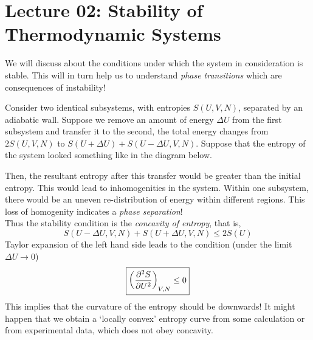 \section*{Lecture 02: Stability of Thermodynamic Systems}
We will discuss about the conditions under which the system in consideration is stable. This will in turn help us to understand \textit{phase transitions} which are consequences of instability! \\[0.2cm]

\begin{figure}[H]
    \centering
    
\end{figure}
\noindent
Consider two identical subsystems, with entropies $S(U,V,N)$, separated by an adiabatic wall. Suppose we remove an amount of energy $\Delta U$ from the first subsystem and transfer it to the second, the total energy changes from $2S(U,V,N)$ to $S(U+\Delta U)+S(U-\Delta U,V,N)$. Suppose that the entropy of the system looked something like in the diagram below. 
\begin{figure}[H]
    \centering
\end{figure}
\noindent
Then, the resultant entropy after this transfer would be greater than the initial entropy. This would lead to inhomogenities in the system. Within one subsystem, there would be an uneven re-distribution of energy within different regions. This loss of homogenity indicates a \textit{phase separation}!\\[0.2cm]
Thus the stability condition is the \textit{concavity of entropy}, that is, 
\begin{equation}\label{eqn:global}
    S(U-\Delta U, V,N)+S(U+\Delta U, V,N)\leq 2S(U)
\end{equation}
Taylor expansion of the left hand side leads to the condition (under the limit $\Delta U \to 0$)
\begin{equation}\label{eqn:local}
    \boxed{\qty(\pdv[2]{S}{U})_{V,N}\leq 0}
\end{equation}
This implies that the curvature of the entropy should be downwards! It might happen that we obtain a `locally convex' entropy curve from some calculation or from experimental data, which does not obey concavity.

